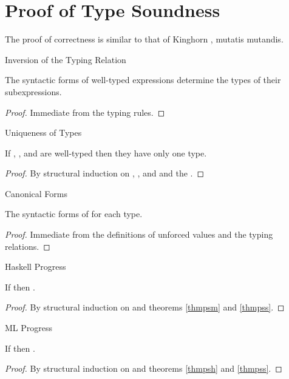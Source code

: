 \section{Proof of Type Soundness}

The proof of correctness is similar to that of Kinghorn \cite{kinghorn07}, mutatis mutandis.

\begin{lemma}{Inversion of the Typing Relation}

\label{leminv}
The syntactic forms of well-typed expressions determine the types of their subexpressions.
\begin{proof}
Immediate from the typing rules.
\end{proof}
\end{lemma}

\begin{lemma}{Uniqueness of Types}

\label{lemuni}
If \varexph, \varexpm, and \varexps are well-typed then they have only one type.
\begin{proof}
By structural induction on \varexph, \varexpm, and \varexps and the \proinv.
\end{proof}
\end{lemma}

\begin{lemma}{Canonical Forms}

\label{lemcan}
The syntactic forms of \prouvs for each type.
\begin{proof}
Immediate from the definitions of unforced values and the typing relations.
\end{proof}
\end{lemma}

\begin{theorem}{Haskell Progress}

\label{thmpsh}
If \judeh{}{\first{\varexph}}{\vartyh} then \pshyp{\first{\varexph}}{\second{\varexph}}.
\begin{proof}
By structural induction on \first{\varexph} and theorems \ref{thmpsm} and \ref{thmpss}.
\end{proof}
\end{theorem}

\begin{theorem}{ML Progress}

\label{thmpsm}
If \judem{}{\first{\varexpm}}{\vartym} then \pshyp{\first{\varexpm}}{\second{\varexpm}}.
\begin{proof}
By structural induction on \first{\varexpm} and theorems \ref{thmpsh} and \ref{thmpss}.
\end{proof}
\end{theorem}

